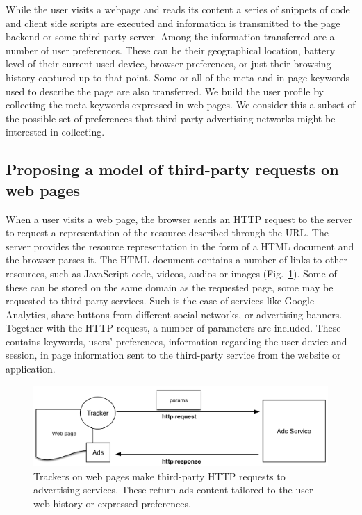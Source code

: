 While the user visits a webpage and reads its content a series of snippets of code and client side scripts are executed and information is transmitted to the page backend or some third-party server. Among the information transferred are a number of user preferences. These can be their geographical location, battery level of their current used device, browser preferences, or just their browsing history captured up to that point. Some or all of the meta and in page keywords used to describe the page are also transferred. We build the user profile by collecting the meta keywords expressed in web pages. We consider this a subset of the possible set of preferences that third-party advertising networks might be interested in collecting.

\subsection{Proposing a model of third-party requests on web pages}
\noindent
When a user visits a web page, the browser sends an HTTP request to the server to request a representation of the resource described through the URL. The server provides the resource representation in the form of a HTML document and the browser parses it. The HTML document contains a number of links to other resources, such as JavaScript code, videos, audios or images (Fig.~\ref{fig:third-party}). Some of these can be stored on the same domain as the requested page, some may be requested to third-party services. Such is the case of services like Google Analytics, share buttons from different social networks, or advertising banners. Together with the HTTP request, a number of parameters are included. These contains keywords, users' preferences, information regarding the user device and session, in page information sent to the third-party service from the website or application.

\begin{figure}
\includegraphics[width=\textwidth]{figures/tracker-request.png}
\caption[Structure of a tracker request]{Trackers on web pages make third-party HTTP requests to advertising services. These return ads content tailored to the user web history or expressed preferences.}
\label{fig:third-party}
\end{figure}


